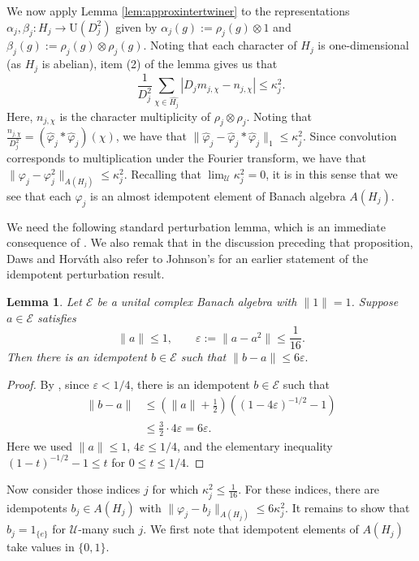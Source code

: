 \documentclass[12pt]{amsart}
\numberwithin{equation}{section}
\newtheorem{lem}[thm]{Lemma}
\theoremstyle{definition}
\def\cal{\mathcal}
\newcommand\cU{{\cal U}}
\def \u{\mathcal U}
\begin{document}
We now apply Lemma \ref{lem:approxintertwiner} to the representations $\alpha_j,\beta_j:H_j\to \mathrm{U}(D_j^2)$ given by $\alpha_j(g):=\rho_j(g)\otimes 1$ and $\beta_j(g):=\rho_j(g)\otimes \rho_j(g)$.  Noting that each character of $H_j$ is one-dimensional (as $H_j$ is abelian), item (2) of the lemma gives us that
$$\frac{1}{D_j^2}\sum_{\chi \in \hat{H_j}}|D_jm_{j,\chi}-n_{j,\chi}|\leq \kappa_j^2.$$  Here, $n_{j,\chi}$ is the character multiplicity of $\rho_j\otimes \rho_j$. Noting that $\frac{n_{j,\chi}}{D_j^2}=(\hat\varphi_j*\hat\varphi_j)(\chi)$, we have that $\|\hat \varphi_j-\hat \varphi_j*\hat \varphi_j\|_{1}\leq \kappa_j^2$.  Since convolution corresponds to multiplication under the Fourier transform, we have that $\|\varphi_j-\varphi_j^2\|_{A(H_j)}\leq \kappa_j^2$.  Recalling that $\lim_\cU \kappa_j^2=0$, it is in this sense that we see that each $\varphi_j$ is an almost idempotent element of Banach algebra $A(H_j)$.

We need the following standard perturbation lemma, which is an immediate
consequence of \cite[Proposition~2.6]{DawsHorvath21}.
We also remak that in the discussion preceding that proposition, Daws and
Horv{\'a}th also refer to Johnson's
\cite[Lemma~2.1]{Johnson1988}
for an earlier statement of the idempotent perturbation result.
\begin{lem}\label{tar:banach-idempotent}
Let $\mathcal E$ be a unital complex Banach algebra with $\|1\|=1$.
Suppose $a\in\mathcal E$ satisfies
\[
 \|a\|\leq1,
 \qquad \varepsilon:=\|a-a^2\|\leq\frac1{16}.
\]
Then there is an idempotent $b\in\mathcal E$ such that $\|b-a\|\leq6\varepsilon.$
\end{lem}

\begin{proof}
By \cite[Proposition~2.6]{DawsHorvath21}, since
$\varepsilon<1/4$, there is an idempotent
$b\in\mathcal E$ such that
\[
\begin{aligned}
\|b-a\|
&\le \left(\|a\|+\frac12\right)
     \left((1-4\varepsilon)^{-1/2}-1\right)\\
&\le \frac32\cdot4\varepsilon
=6\varepsilon.
\end{aligned}
\]
Here we used $\|a\|\le1$, $4\varepsilon\le1/4$,
and the elementary inequality
$(1-t)^{-1/2}-1\le t$ for $0\le t\le1/4$.
\end{proof}

Now consider those indices $j$ for which $\kappa_j^2\leq \frac{1}{16}$.  For these indices, there are idempotents $b_j\in A(H_j)$ with $\|\varphi_j-b_j\|_{A(H_j)}\leq 6\kappa_j^2$.  It remains to show that $b_j=1_{\{e\}}$ for $\u$-many such $j$.  We first note that idempotent elements of $A(H_j)$ take values in $\{0,1\}$.  
\end{document}
